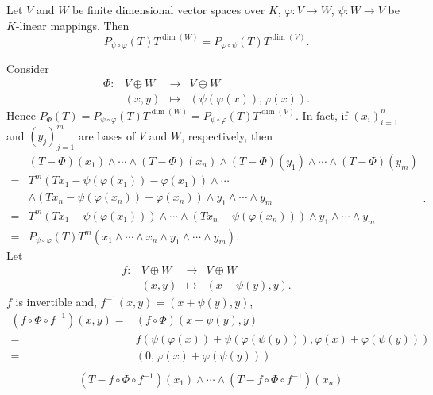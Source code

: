 \begin{theoremenv}
    Let $V$ and $W$ be finite dimensional vector spaces over $K$,
    $\varphi : V \rightarrow W$, $\psi : W \rightarrow V$ be $K$-linear mappings.
    Then
    $$P_{\psi \circ \varphi}(T) T^{\dim(W)} = P_{\varphi\circ\psi}(T) T^{\dim(V)}.$$
\end{theoremenv}
\begin{proofenv}
    Consider
    $$\begin{array}{rrcl}
        \Phi : & V \oplus W & \longrightarrow & V \oplus W\\
        & (x,y) & \longmapsto & (\psi(\varphi(x)), \varphi(x)).
    \end{array}$$
    Hence $P_{\Phi}(T) = P_{\psi \circ \varphi}(T) T^{\dim(W)} = P_{\psi\circ\varphi}(T) T^{\dim(V)}$.
    In fact, if $(x_i)_{i = 1}^n$ and $(y_{j})_{j = 1}^m$ are bases of $V$ and $W$, respectively, then
    $$\begin{aligned}
        & (T - \Phi)(x_1)\wedge \cdots \wedge (T-\Phi)(x_n) \wedge (T-\Phi)(y_1)\wedge \cdots \wedge (T-\Phi)(y_m)\\
        = & T^m(Tx_1 - \psi(\varphi(x_1))- \varphi(x_1)) \wedge \cdots\\
        & \wedge (Tx_n - \psi(\varphi(x_n)) - \varphi(x_n)) \wedge y_1 \wedge \cdots \wedge y_m\\
        = & T^m(Tx_1 - \psi(\varphi(x_1))) \wedge \cdots \wedge (Tx_n - \psi(\varphi(x_n))) \wedge y_1 \wedge \cdots \wedge y_m\\
        = & P_{\psi \circ \varphi}(T) T^{m} (x_1 \wedge \cdots \wedge x_n \wedge y_1 \wedge \cdots \wedge y_m).
    \end{aligned}.$$
    Let
    $$\begin{array}{rrcl}
        f : & V \oplus W & \longrightarrow & V \oplus W\\
        & (x,y) & \longmapsto & (x - \psi(y), y).
    \end{array}$$
    $f$ is invertible and, $f^{-1}(x,y) = (x + \psi(y),y)$,
    $$\begin{aligned}
        (f \circ \Phi \circ f^{-1})(x,y) = & (f \circ \Phi)(x + \psi(y), y)\\
        = & f(\psi(\varphi(x)) + \psi(\varphi(\psi(y))), \varphi(x) + \varphi(\psi(y)))\\
        = & (0, \varphi(x) + \varphi(\psi(y)))\\
    \end{aligned}$$
    $$\begin{aligned}
        & (T - f \circ \Phi \circ f^{-1})(x_1) \wedge \cdots \wedge (T - f \circ \Phi \circ f^{-1})(x_n)\\

\end{aligned}$$
\end{proofenv}
